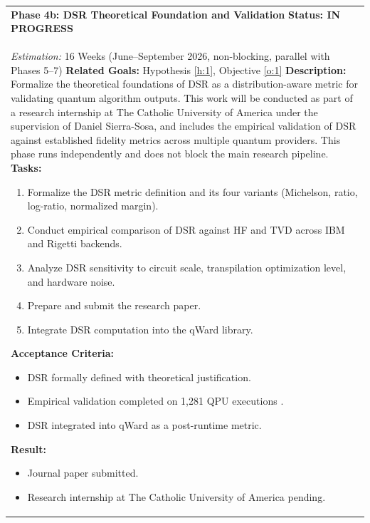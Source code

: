 \documentclass{article}
\begin{document}
\begin{longtable}{@{}p{\textwidth}@{}}
    \textbf{Phase 4b: DSR Theoretical Foundation and Validation} \label{p:4b} \hfill \textbf{Status: IN PROGRESS} \\
    \textit{Estimation:} 16 Weeks (June--September 2026, non-blocking, parallel with Phases 5--7) \newline
    \textbf{Related Goals:} Hypothesis \ref{h:1}, Objective \ref{o:1} \newline
    \textbf{Description:} Formalize the theoretical foundations of DSR as a distribution-aware metric for validating quantum algorithm outputs. This work will be conducted as part of a research internship at The Catholic University of America under the supervision of Daniel Sierra-Sosa, and includes the empirical validation of DSR against established fidelity metrics across multiple quantum providers. This phase runs independently and does not block the main research pipeline. \newline
    \textbf{Tasks:}
    \begin{enumerate}[label=T4b.\arabic*, ref=T4b.\arabic*, font=\bfseries, leftmargin=3.5em, labelindent=0pt, itemindent=0pt, labelsep=0.5em, noitemsep, topsep=0pt]
        \item \label{p4b:t1} Formalize the DSR metric definition and its four variants (Michelson, ratio, log-ratio, normalized margin).
        \item \label{p4b:t2} Conduct empirical comparison of DSR against HF and TVD across IBM and Rigetti backends.
        \item \label{p4b:t3} Analyze DSR sensitivity to circuit scale, transpilation optimization level, and hardware noise.
        \item \label{p4b:t4} Prepare and submit the research paper.
        \item \label{p4b:t5} Integrate DSR computation into the qWard library.
    \end{enumerate}
    \textbf{Acceptance Criteria:}
    \begin{itemize}[leftmargin=1.5em, labelindent=0pt, itemindent=0pt, noitemsep, topsep=0pt]
        \item DSR formally defined with theoretical justification.
        \item Empirical validation completed on 1,281 QPU executions \cite{data_2}.
        \item DSR integrated into qWard as a post-runtime metric.
    \end{itemize}
    \textbf{Result:}
    \begin{itemize}[leftmargin=1.5em, labelindent=0pt, itemindent=0pt, noitemsep, topsep=0pt]
        \item Journal paper submitted.
        \item Research internship at The Catholic University of America pending.
    \end{itemize} \\
    \midrule


\end{longtable}
\end{document}
